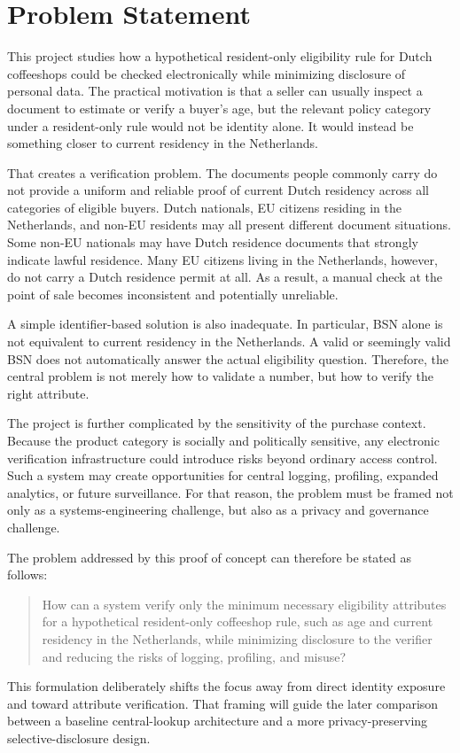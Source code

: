 \section{Problem Statement}

This project studies how a hypothetical resident-only eligibility rule for Dutch coffeeshops could be checked electronically while minimizing disclosure of personal data. The practical motivation is that a seller can usually inspect a document to estimate or verify a buyer's age, but the relevant policy category under a resident-only rule would not be identity alone. It would instead be something closer to current residency in the Netherlands.

That creates a verification problem. The documents people commonly carry do not provide a uniform and reliable proof of current Dutch residency across all categories of eligible buyers. Dutch nationals, EU citizens residing in the Netherlands, and non-EU residents may all present different document situations. Some non-EU nationals may have Dutch residence documents that strongly indicate lawful residence. Many EU citizens living in the Netherlands, however, do not carry a Dutch residence permit at all. As a result, a manual check at the point of sale becomes inconsistent and potentially unreliable.

A simple identifier-based solution is also inadequate. In particular, BSN alone is not equivalent to current residency in the Netherlands. A valid or seemingly valid BSN does not automatically answer the actual eligibility question. Therefore, the central problem is not merely how to validate a number, but how to verify the right attribute.

The project is further complicated by the sensitivity of the purchase context. Because the product category is socially and politically sensitive, any electronic verification infrastructure could introduce risks beyond ordinary access control. Such a system may create opportunities for central logging, profiling, expanded analytics, or future surveillance. For that reason, the problem must be framed not only as a systems-engineering challenge, but also as a privacy and governance challenge.

The problem addressed by this proof of concept can therefore be stated as follows:

\begin{quote}
How can a system verify only the minimum necessary eligibility attributes for a hypothetical resident-only coffeeshop rule, such as age and current residency in the Netherlands, while minimizing disclosure to the verifier and reducing the risks of logging, profiling, and misuse?
\end{quote}

This formulation deliberately shifts the focus away from direct identity exposure and toward attribute verification. That framing will guide the later comparison between a baseline central-lookup architecture and a more privacy-preserving selective-disclosure design.